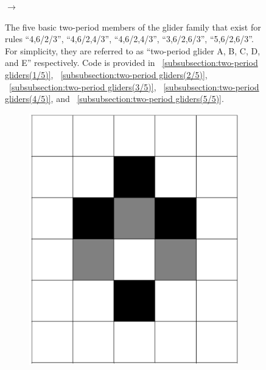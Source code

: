 \documentclass[12pt]{article}
\numberwithin{figure}{section} %
\begin{document}
\begin{figure}[H]
\begin{subfigure}{0.3\textwidth}
     \subcaption{}
   \end{subfigure}
      {\LARGE$\xrightarrow{}$}
   \setcounter{subfigure}{0}
   \caption{The five basic two-period members of the glider family that exist for rules “4,6/2/3”, “4,6/2,4/3”, “4,6/2,4/3”, “3,6/2,6/3”, “5,6/2,6/3”. For simplicity, they are referred to as “two-period glider A, B, C, D, and E” respectively. Code is provided in ~\ref{subsubsection:two-period gliders(1/5)}, ~\ref{subsubsection:two-period gliders(2/5)}, ~\ref{subsubsection:two-period gliders(3/5)}, ~\ref{subsubsection:two-period gliders(4/5)}, and ~\ref{subsubsection:two-period gliders(5/5)}.}
   \label{fig:two-period gliders}
   \vspace{-1.5em}
\end{figure}

\begin{figure}[H]
 \begin{subfigure}{0.18\textwidth}
     \centering
     \includegraphics[angle=270,width=\linewidth]{Section4/8.0}
     \subcaption{}
   \end{subfigure}
     \begin{subfigure}{0.18\textwidth}

\end{subfigure}
\end{figure}
\end{document}
